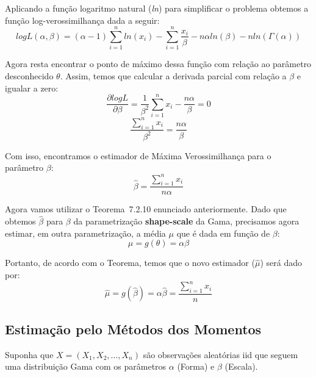 Aplicando a função logaritmo natural (\textit{ln}) para simplificar o problema obtemos  a função log-verossimilhança dada a seguir:
\begin{equation}
logL(\alpha, \beta) = (\alpha-1) \sum_{i=1}^{n} ln(x_i) - \sum_{i=1}^{n} \frac{x_i}{\beta} - n \alpha ln(\beta) - n ln(\Gamma(\alpha))
\end{equation}

Agora resta encontrar o ponto de máximo dessa função com relação ao parâmetro desconhecido $\theta$. Assim, temos que calcular a derivada parcial com relação a $\beta$ e igualar a zero:
\begin{equation}
\frac{\partial logL}{\partial \beta} = \frac{1}{\beta^2}\sum_{i=1}^{n}x_i - \frac{n\alpha}{\beta} = 0
\end{equation}
\begin{equation}
\frac{\sum_{i=1}^{n}x_i}{\beta^2} = \frac{n\alpha}{\beta} 
\end{equation}


Com isso, encontramos o estimador de Máxima Verossimilhança para o parâmetro $\beta$:
\begin{equation}
 \widehat{\beta} = \frac{\sum_{i=1}^{n}x_i}{n\alpha} 
\end{equation}

Agora vamos utilizar o Teorema~7.2.10 enunciado anteriormente. Dado que obtemos $\widehat{\beta}$ para $\beta$ da parametrização \textbf{shape-scale} da Gama, precisamos agora estimar, em outra parametrização, a média $\mu$ que é dada em função de $\beta$:
\begin{equation}
\mu = g(\theta) = \alpha\beta
\end{equation}

Portanto, de acordo com o Teorema, temos que o novo estimador ($\widehat{\mu}$) será dado por:
\begin{equation}
\widehat{\mu} = g(\widehat{\beta}) = \alpha\widehat{\beta}=  \frac{\sum_{i=1}^{n}x_i}{n}
\end{equation}

\subsection{Estimação pelo Métodos dos Momentos}

Suponha que \begin{math} X = (X_1, X_2, \dots, X_n) \end{math} são observações aleatórias iid que seguem uma distribuição Gama com os parâmetros $\alpha$ (Forma) e $\beta$ (Escala).


